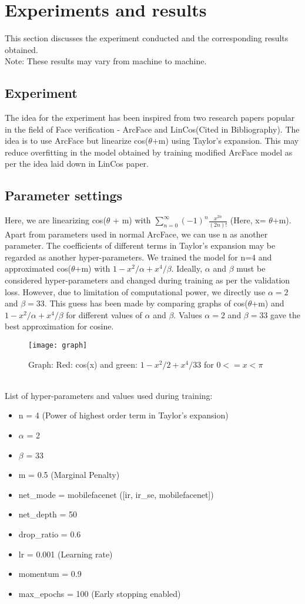 \chapter{Experiments and results}
This section discusses the experiment conducted and the corresponding results obtained.\\
Note: These results may vary from machine to machine.
\section{Experiment}
The idea for the experiment has been inspired from two research papers popular in the field of Face verification - ArcFace and LinCos(Cited in Bibliography). The idea is to use ArcFace but linearize cos($\theta$+m) using Taylor's expansion. This may reduce overfitting in the model obtained by training modified ArcFace model as per the idea laid down in LinCos paper.
\section{Parameter settings}
Here, we are linearizing cos($\theta$ + m) with $\sum_{n=0}^{\infty}(-1)^{n} \frac{x^{2 n}}{(2 n) !}$ (Here, x= $\theta$+m). Apart from parameters used in normal ArcFace, we can use n as another parameter. The coefficients of different terms in Taylor's expansion may be regarded as another hyper-parameters. We trained the model for n=4 and approximated cos($\theta$+m) with $1-x^2/\alpha+x^4/\beta$. Ideally, $\alpha$ and $\beta$ must be considered hyper-parameters and changed during training as per the validation loss. However, due to limitation of computational power, we directly use $\alpha=2$ and $\beta=33$. This guess has been made by comparing graphs of cos($\theta$+m) and $1-x^2/\alpha+x^4/\beta$ for different values of $\alpha$ and $\beta$. Values $\alpha=2$ and $\beta=33$ gave the best approximation for cosine.\\
\begin{figure}[!h]
    		\centering
    		\texttt{[image: graph]}
    		\caption{Graph: Red: cos(x) and green: $1-x^2/2+x^4/33$ for $0<=x<\pi$}
\end{figure}\\
List of hyper-parameters and values used during training:
\begin{itemize}
    \item n = 4 (Power of highest order term in Taylor's expansion)
    \item $\alpha$ = 2
    \item $\beta$ = 33
    \item m = 0.5 (Marginal Penalty)
    \item net\_mode = mobilefacenet ([ir, ir\_se, mobilefacenet])
    \item net\_depth = 50
    \item drop\_ratio = 0.6
    \item lr = 0.001 (Learning rate)
    \item momentum = 0.9
    \item max\_epochs = 100 (Early stopping enabled)
\end{itemize}
